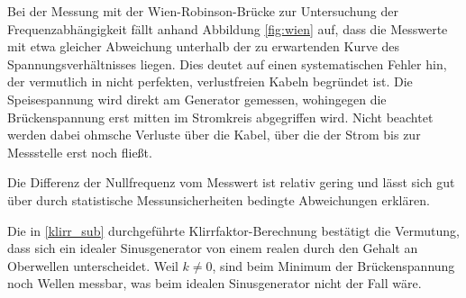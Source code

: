 Bei der Messung mit der Wien-Robinson-Brücke zur Untersuchung der Frequenzabhängigkeit fällt anhand Abbildung \ref{fig:wien} 
auf, dass die Messwerte mit etwa gleicher Abweichung unterhalb der zu erwartenden Kurve des Spannungsverhältnisses liegen. 
Dies deutet auf einen systematischen Fehler hin, der vermutlich in nicht perfekten, verlustfreien Kabeln begründet ist. 
Die Speisespannung wird direkt am Generator gemessen, wohingegen die Brückenspannung erst mitten im Stromkreis abgegriffen 
wird. Nicht beachtet werden dabei ohmsche Verluste über die Kabel, über die der Strom bis zur Messstelle erst noch fließt.

Die Differenz der Nullfrequenz vom Messwert ist relativ gering und lässt sich gut über durch statistische Messunsicherheiten 
bedingte Abweichungen erklären.

Die in \ref{klirr_sub} durchgeführte Klirrfaktor-Berechnung bestätigt die Vermutung, dass sich ein idealer Sinusgenerator 
von einem realen durch den Gehalt an Oberwellen unterscheidet. 
Weil ${k \neq 0}$, sind beim Minimum der Brückenspannung noch Wellen messbar, was beim idealen Sinusgenerator nicht der Fall wäre. 
